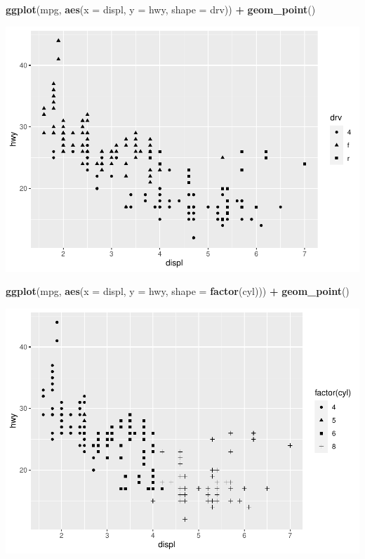 \documentclass[
]{book}
\newenvironment{Shaded}{\begin{snugshade}}{\end{snugshade}}
\newcommand{\DataTypeTok}[1]{\textcolor[rgb]{0.13,0.29,0.53}{#1}}
\newcommand{\KeywordTok}[1]{\textcolor[rgb]{0.13,0.29,0.53}{\textbf{#1}}}
\newcommand{\NormalTok}[1]{#1}
\newcommand{\OperatorTok}[1]{\textcolor[rgb]{0.81,0.36,0.00}{\textbf{#1}}}
\newcommand{\StringTok}[1]{\textcolor[rgb]{0.31,0.60,0.02}{#1}}
\begin{document}
\begin{Shaded}
\begin{Highlighting}[]
\KeywordTok{ggplot}\NormalTok{(mpg, }\KeywordTok{aes}\NormalTok{(}\DataTypeTok{x =}\NormalTok{ displ, }\DataTypeTok{y =}\NormalTok{ hwy, }\DataTypeTok{shape =}\NormalTok{ drv)) }\OperatorTok{+}\StringTok{ }\KeywordTok{geom_point}\NormalTok{()}
\end{Highlighting}
\end{Shaded}

\includegraphics{_main_files/figure-latex/unnamed-chunk-316-2.pdf}

\begin{Shaded}
\begin{Highlighting}[]
\KeywordTok{ggplot}\NormalTok{(mpg, }\KeywordTok{aes}\NormalTok{(}\DataTypeTok{x =}\NormalTok{ displ, }\DataTypeTok{y =}\NormalTok{ hwy, }\DataTypeTok{shape =} \KeywordTok{factor}\NormalTok{(cyl))) }\OperatorTok{+}\StringTok{ }\KeywordTok{geom_point}\NormalTok{()}
\end{Highlighting}
\end{Shaded}

\includegraphics{_main_files/figure-latex/unnamed-chunk-316-3.pdf}
\end{document}
